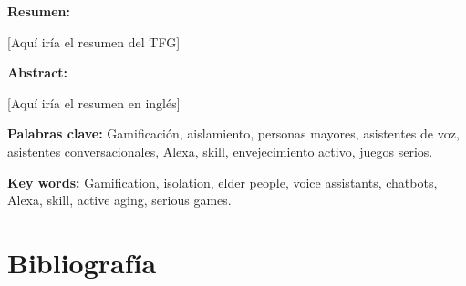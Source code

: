 \documentclass[12pt]{article}
\begin{document}
\newpage
\textbf{Resumen:}

[Aquí iría el resumen del TFG]

\textbf{Abstract:}

[Aquí iría el resumen en inglés]

\textbf{Palabras clave:}
Gamificación, aislamiento, personas mayores, asistentes de voz, asistentes conversacionales, Alexa, skill, envejecimiento activo, juegos serios.

\textbf{Key words:}
Gamification, isolation, elder people, voice assistants, chatbots, Alexa, skill, active aging, serious games.

\newpage
\tableofcontents

\newpage
\listoffigures

\newpage
\listoftables

\newpage
\justify


\newpage


\newpage


\newpage


\newpage


\newpage


\newpage


\newpage


\newpage


\newpage
\section{Bibliografía}
\renewcommand{\bibitemsep}{1em}
\printbibliography[heading=empty]
\end{document}
